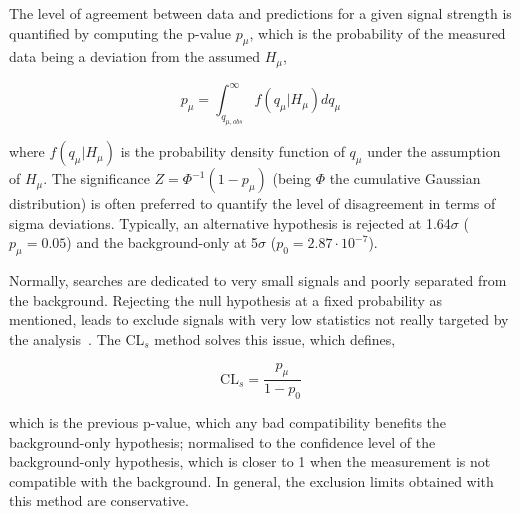 The level of agreement between data and predictions for a given signal strength is quantified by computing the p-value $p_\mu$, which is the probability of the measured data being a deviation from the assumed $H_\mu$,

\begin{equation}
    p_\mu = \int_{q_{\mu,obs}}^\infty f(q_\mu|H_\mu)dq_\mu
\end{equation}

where $f(q_\mu|H_\mu)$ is the probability density function of $q_\mu$ under the assumption of $H_\mu$. The significance $Z=\Phi^{-1}(1-p_\mu)$ (being $\Phi$ the cumulative Gaussian distribution) is often preferred to quantify the level of disagreement in terms of sigma deviations. Typically, an alternative hypothesis is rejected at 1.64$\sigma$ ($p_\mu=0.05$) and the background-only at 5$\sigma$ ($p_0=2.87\cdot10^{-7}$).

Normally, searches are dedicated to very small signals and poorly separated from the background. Rejecting the null hypothesis at a fixed probability as mentioned, leads to exclude signals with very low statistics not really targeted by the analysis~\cite{JUNK1999435}. The CL$_{s}$ method solves this issue, which defines,

\begin{equation}
    \text{CL}_{s}=\frac{p_\mu}{1-p_0}
\end{equation}

which is the previous p-value, which any bad compatibility benefits the background-only hypothesis; normalised to the confidence level of the background-only hypothesis, which is closer to 1 when the measurement is not compatible with the background. In general, the exclusion limits obtained with this method are conservative.

